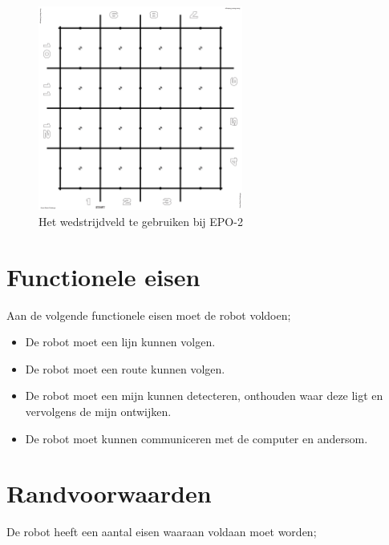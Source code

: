 \documentclass{report}
\begin{document}
\label{sec:field}

\begin{figure}[H]
	\centering
	\includegraphics[width=0.6\textwidth]{competitionField2440x2440-rc.pdf}
	\caption{Het wedstrijdveld te gebruiken bij EPO-2}
	\label{fig:field}
\end{figure}


\section{Functionele eisen}

Aan de volgende functionele eisen moet de robot voldoen;

\begin{itemize}

\item
De robot moet een lijn kunnen volgen.


\item 
De robot moet een route kunnen volgen.

\item
De robot moet een mijn kunnen detecteren, onthouden waar deze ligt en vervolgens de mijn ontwijken.

\item 
De robot moet kunnen communiceren met de computer en andersom.

\end{itemize}


\section{Randvoorwaarden}

De robot heeft een aantal eisen waaraan voldaan moet worden;
\end{document}
